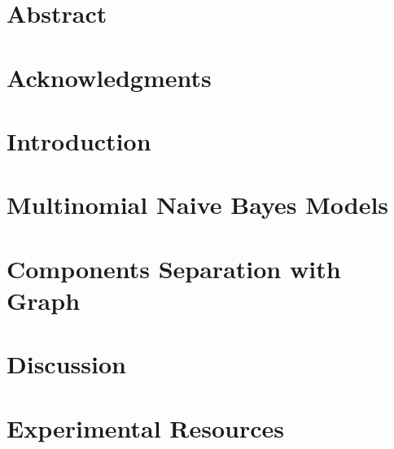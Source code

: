 \documentclass[11pt, oneside]{book}
\begin{document}
{
	\restoregeometry
	
}	
	
	\frontmatter
	\setcounter{page}{2}
	\chapter*{Abstract}
	
	
	\chapter*{Acknowledgments}
	

{
	\hypersetup{linkcolor=black}
	\tableofcontents
	
	\listoffigures
	
	\listoftables
}

	\mainmatter

	\chapter{Introduction}
	
	
	\chapter{Multinomial Naive Bayes Models}
	\label{chapter 2}
	
	
	\chapter{Components Separation with Graph}
	
	
	\chapter{Discussion}
	
	
	\appendix
	\chapter{Experimental Resources}
	\label{appx: Experiments Resources}
	

	
{
	\hypersetup{linkcolor=black}
	\printbibliography
}
\end{document}
